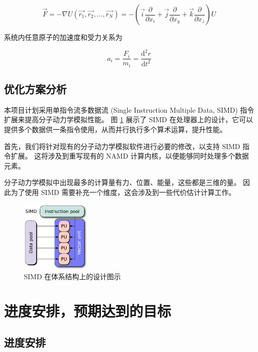 \begin{equation}
    \vec{F} = -\nabla U (\vec{r_1}, \vec{r_2}, \dots, \vec{r_N}) = - \left( \vec{i} \frac{\partial}{\partial x_i} + \vec{j}\frac{\partial}{\partial x_y} + \vec{k} \frac{\partial}{\partial x_z}\right) U
\end{equation}

系统内任意原子的加速度和受力关系为\cite{易浩杰2019纳米静电喷射的分子动力学模拟研究}

\begin{equation}
    a_i = \frac{F_i}{m_i} = \frac{\mathrm{d}^2 r}{\mathrm{d} t^2}
\end{equation}


\subsection{优化方案分析}

本项目计划采用单指令流多数据流 (Single Instruction Multiple Data, SIMD) 指令扩展来提高分子动力学模拟性能。
图 \ref{fig:simd} 展示了 SIMD 在处理器上的设计，它可以提供多个数据供一条指令使用，从而并行执行多个算术运算，提升性能。


首先，我们将针对现有的分子动力学模拟软件进行必要的修改，以支持 SIMD 指令扩展。
这将涉及到重写现有的 NAMD 计算内核，以便能够同时处理多个数据元素。

分子动力学模拟中出现最多的计算量有力、位置、能量，这些都是三维的量。
因此为了使用 SIMD 需要补充一个维度，这会涉及到一些代价估计计算工作。


\begin{figure}[h]
    \centering
    \includegraphics[width=0.3\textwidth]{images/SIMD2.svg.png}
    \caption{SIMD 在体系结构上的设计图示}
    \label{fig:simd}
\end{figure}

\section{进度安排，预期达到的目标}

\subsection{进度安排}

